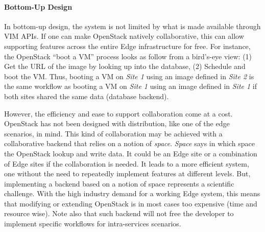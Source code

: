 





\paragraph{Bottom-Up Design}
In bottom-up design, the system is not limited by what is
made available through VIM APIs. If one can make OpenStack natively
collaborative, this can allow supporting features across the entire
Edge infrastructure for free. For instance, the OpenStack ``boot a
VM'' process looks as follow from a bird's-eye view: (1) Get the URL
of the image by looking up into the database, (2) Schedule and boot
the VM. Thus, booting a VM on \emph{Site 1} using an image defined in
\emph{Site 2} is the same workflow as booting a VM on \emph{Site 1}
using an image defined in \emph{Site 1} if both sites shared the same
data (\ie database backend).

However, the efficiency and ease to support collaboration come at a
cost. OpenStack has not been designed with distribution, like one of
the edge scenarios, in mind. This kind of collaboration may be
achieved with a collaborative backend that relies on a notion of
\emph{space}. \emph{Space} says in which space the OpenStack lookup
and write data. It could be an Edge site or a combination of Edge
sites if the collaboration is needed. It leads to a more efficient
system, one without the need to repeatedly implement features at
different levels. But, implementing a backend based on a notion of
space represents a scientific challenge. With the high industry demand
for a working Edge system, this means that modifying or extending
OpenStack is in most cases too expensive (time and resource wise).
Note also that such backend will not free the developer to implement
specific workflows for intra-services scenarios.

